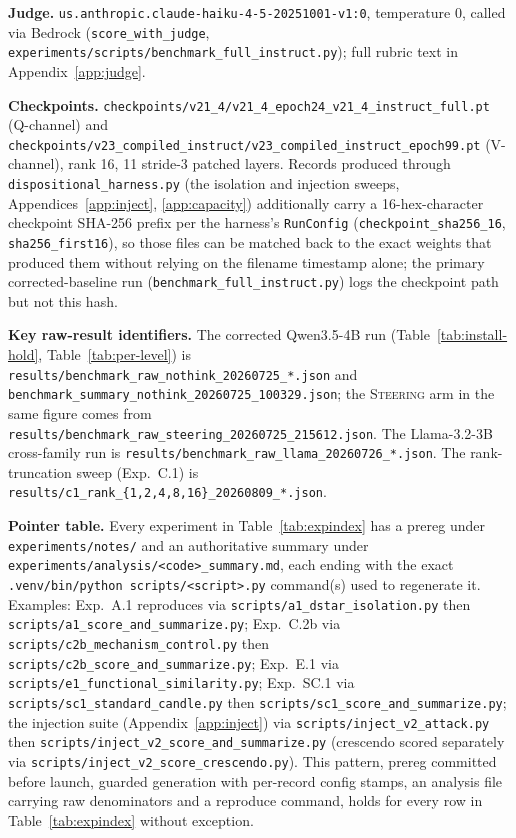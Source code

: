\textbf{Judge.} \texttt{us.anthropic.claude-haiku-4-5-20251001-v1:0}, temperature 0,
called via Bedrock (\texttt{score\_with\_judge},
\texttt{experiments/scripts/benchmark\_full\_instruct.py}); full rubric text in
Appendix~\ref{app:judge}.

\textbf{Checkpoints.} \texttt{checkpoints/v21\_4/v21\_4\_epoch24\_v21\_4\_instruct\_full.pt}
(Q-channel) and \texttt{checkpoints/v23\_compiled\_instruct/v23\_compiled\_instruct\_epoch99.pt}
(V-channel), rank 16, 11 stride-3 patched layers. Records produced through
\texttt{dispositional\_harness.py} (the isolation and injection sweeps,
Appendices~\ref{app:inject}, \ref{app:capacity}) additionally carry a 16-hex-character
checkpoint SHA-256 prefix per the harness's \texttt{RunConfig}
(\texttt{checkpoint\_sha256\_16}, \texttt{sha256\_first16}), so those files can be matched
back to the exact weights that produced them without relying on the filename timestamp
alone; the primary corrected-baseline run (\texttt{benchmark\_full\_instruct.py}) logs the
checkpoint path but not this hash.

\textbf{Key raw-result identifiers.} The corrected Qwen3.5-4B run (Table~\ref{tab:install-hold},
Table~\ref{tab:per-level}) is \texttt{results/benchmark\_raw\_nothink\_20260725\_*.json}
and \texttt{benchmark\_summary\_nothink\_20260725\_100329.json}; the \textsc{Steering}
arm in the same figure comes from \texttt{results/benchmark\_raw\_steering\_20260725\_215612.json}.
The Llama-3.2-3B cross-family run is \texttt{results/benchmark\_raw\_llama\_20260726\_*.json}.
The rank-truncation sweep (Exp.~C.1) is \texttt{results/c1\_rank\_\{1,2,4,8,16\}\_20260809\_*.json}.

\textbf{Pointer table.} Every experiment in Table~\ref{tab:expindex} has a prereg under
\texttt{experiments/notes/} and an authoritative summary under
\texttt{experiments/analysis/<code>\_summary.md}, each ending with the exact
\texttt{.venv/bin/python scripts/<script>.py} command(s) used to regenerate it. Examples:
Exp.~A.1 reproduces via \texttt{scripts/a1\_dstar\_isolation.py} then
\texttt{scripts/a1\_score\_and\_summarize.py}; Exp.~C.2b via
\texttt{scripts/c2b\_mechanism\_control.py} then \texttt{scripts/c2b\_score\_and\_summarize.py};
Exp.~E.1 via \texttt{scripts/e1\_functional\_similarity.py}; Exp.~SC.1 via
\texttt{scripts/sc1\_standard\_candle.py} then \texttt{scripts/sc1\_score\_and\_summarize.py};
the injection suite (Appendix~\ref{app:inject}) via \texttt{scripts/inject\_v2\_attack.py}
then \texttt{scripts/inject\_v2\_score\_and\_summarize.py} (crescendo scored separately via
\texttt{scripts/inject\_v2\_score\_crescendo.py}). This pattern, prereg committed before
launch, guarded generation with per-record config stamps, an analysis file carrying raw
denominators and a reproduce command, holds for every row in Table~\ref{tab:expindex}
without exception.

